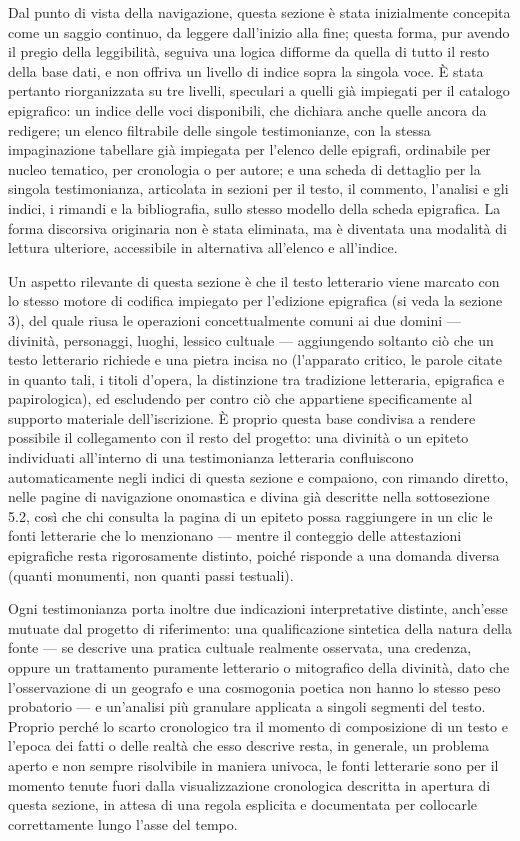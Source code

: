 \documentclass[11pt,a4paper]{article}
\begin{document}
Dal punto di vista della navigazione, questa sezione è stata inizialmente
concepita come un saggio continuo, da leggere dall'inizio alla fine;
questa forma, pur avendo il pregio della leggibilità, seguiva una logica
difforme da quella di tutto il resto della base dati, e non offriva un
livello di indice sopra la singola voce. È stata pertanto riorganizzata
su tre livelli, speculari a quelli già impiegati per il catalogo
epigrafico: un indice delle voci disponibili, che dichiara anche quelle
ancora da redigere; un elenco filtrabile delle singole testimonianze, con
la stessa impaginazione tabellare già impiegata per l'elenco delle
epigrafi, ordinabile per nucleo tematico, per cronologia o per autore; e
una scheda di dettaglio per la singola testimonianza, articolata in
sezioni per il testo, il commento, l'analisi e gli indici, i rimandi e la
bibliografia, sullo stesso modello della scheda epigrafica. La forma
discorsiva originaria non è stata eliminata, ma è diventata una modalità
di lettura ulteriore, accessibile in alternativa all'elenco e all'indice.

Un aspetto rilevante di questa sezione è che il testo letterario viene
marcato con lo stesso motore di codifica impiegato per l'edizione
epigrafica (si veda la sezione 3), del quale riusa le operazioni
concettualmente comuni ai due domini --- divinità, personaggi, luoghi,
lessico cultuale --- aggiungendo soltanto ciò che un testo letterario
richiede e una pietra incisa no (l'apparato critico, le parole citate in
quanto tali, i titoli d'opera, la distinzione tra tradizione letteraria,
epigrafica e papirologica), ed escludendo per contro ciò che appartiene
specificamente al supporto materiale dell'iscrizione. È proprio questa
base condivisa a rendere possibile il collegamento con il resto del
progetto: una divinità o un epiteto individuati all'interno di una
testimonianza letteraria confluiscono automaticamente negli indici di
questa sezione e compaiono, con rimando diretto, nelle pagine di
navigazione onomastica e divina già descritte nella sottosezione 5.2,
così che chi consulta la pagina di un epiteto possa raggiungere in un
clic le fonti letterarie che lo menzionano --- mentre il conteggio delle
attestazioni epigrafiche resta rigorosamente distinto, poiché risponde a
una domanda diversa (quanti monumenti, non quanti passi testuali).

Ogni testimonianza porta inoltre due indicazioni interpretative distinte,
anch'esse mutuate dal progetto di riferimento: una qualificazione
sintetica della natura della fonte --- se descrive una pratica cultuale
realmente osservata, una credenza, oppure un trattamento puramente
letterario o mitografico della divinità, dato che l'osservazione di un
geografo e una cosmogonia poetica non hanno lo stesso peso probatorio ---
e un'analisi più granulare applicata a singoli segmenti del testo.
Proprio perché lo scarto cronologico tra il momento di composizione di un
testo e l'epoca dei fatti o delle realtà che esso descrive resta, in
generale, un problema aperto e non sempre risolvibile in maniera
univoca, le fonti letterarie sono per il momento tenute fuori dalla
visualizzazione cronologica descritta in apertura di questa sezione, in
attesa di una regola esplicita e documentata per collocarle correttamente
lungo l'asse del tempo.
\end{document}

